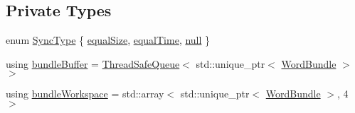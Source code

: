 \subsection*{Private Types}
\begin{DoxyCompactItemize}
\item 
enum \hyperlink{class_file_reader_aa591258dbf3366cfd674e84a1f2f6531}{Sync\+Type} \{ \hyperlink{class_file_reader_aa591258dbf3366cfd674e84a1f2f6531a6b72ad97055eb6a5c19ea9d412601ca8}{equal\+Size}, 
\hyperlink{class_file_reader_aa591258dbf3366cfd674e84a1f2f6531ace0da9d32c3bd689d964979d99a7edc1}{equal\+Time}, 
\hyperlink{class_file_reader_aa591258dbf3366cfd674e84a1f2f6531a3d35358ce57d04ec9c0e07af48692c88}{null}
 \}
\item 
using \hyperlink{class_file_reader_ac755c1e271610c2c12a7fc5b55cc048b}{bundle\+Buffer} = \hyperlink{class_thread_safe_queue}{Thread\+Safe\+Queue}$<$ std\+::unique\+\_\+ptr$<$ \hyperlink{class_word_bundle}{Word\+Bundle} $>$ $>$
\item 
using \hyperlink{class_file_reader_a7fb625dc45cee3256d37cc19c65cad86}{bundle\+Workspace} = std\+::array$<$ std\+::unique\+\_\+ptr$<$ \hyperlink{class_word_bundle}{Word\+Bundle} $>$, 4 $>$
\end{DoxyCompactItemize}
